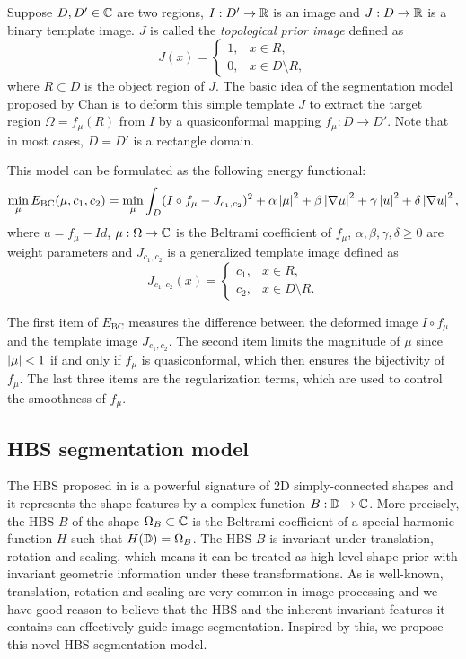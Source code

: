 \documentclass[review,onefignum,onetabnum]{siamonline190516}
\begin{document}
Suppose $D, D' \in \mathbb{C}$ are two regions, $I: D' \rightarrow \mathbb{R}$ is an image and $J: D \rightarrow \mathbb{R}$ is a binary template image. $J$ is called the \textit{topological prior image} defined as
\begin{equation}
    J(x) = \begin{cases}
        1, & x \in R,              \\
        0, & x \in D \setminus R,
    \end{cases}
\end{equation}
where $R \subset D$ is the object region of $J$. The basic idea of the segmentation model proposed by Chan \etal \cite{} is to deform this simple template $J$ to extract the target region $\Omega = f_\mu(R)$ from $I$ by a quasiconformal mapping $f_\mu: D \rightarrow D'$. Note that in most cases, $D = D'$ is a rectangle domain.

This model can be formulated as the following energy functional:
\begin{equation}\label{bc seg model}
    \min_{\mu} E_{\text{BC}}(\mu, c_1, c_2) = \min_{\mu} \int_D (I \circ f_\mu - J_{c_1,c_2})^2 + \alpha \abs{\mu}^2 + \beta \abs{\nabla \mu}^2 + \gamma \abs{u}^2 + \delta \abs{\nabla u}^2,
\end{equation}
where $u = f_\mu - Id$, $\mu: \Omega \rightarrow \mathbb{C}$ is the Beltrami coefficient of $f_\mu$,  $\alpha, \beta, \gamma, \delta \ge 0$ are weight parameters and $J_{c_1, c_2}$ is a generalized template image defined as
\begin{equation}
    J_{c_1, c_2}(x) = \begin{cases}
        c_1, & x \in R,              \\
        c_2, & x \in D \setminus R.
    \end{cases}
\end{equation}

The first item of $E_{\text{BC}}$ measures the difference between the deformed image $I \circ f_\mu$ and the template image $J_{c_1, c_2}$. The second item limits the magnitude of $\mu$ since $\left\vert \mu \right\vert < 1$ if and only if $f_\mu$ is quasiconformal, which then ensures the bijectivity of $f_\mu$. The last three items are the regularization terms, which are used to control the smoothness of $f_\mu$.

\subsection{HBS segmentation model}
The HBS proposed in \cite{} is a powerful signature of 2D simply-connected shapes and  it represents the shape features by a complex function $B: \mathbb{D} \rightarrow \mathbb{C}$. More precisely, the HBS $B$ of the shape $\Omega_B \subset \mathbb{C}$ is the Beltrami coefficient of a special harmonic function $H$ such that $H(\mathbb{D}) = \Omega_B$. The HBS $B$ is invariant under translation, rotation and scaling, which means it can be treated as high-level shape prior with invariant geometric information under these transformations. As is well-known, translation, rotation and scaling are very common in image processing and we have good reason to believe that the HBS and the inherent invariant features it contains can effectively guide image segmentation. Inspired by this, we propose this novel HBS segmentation model.
\end{document}
